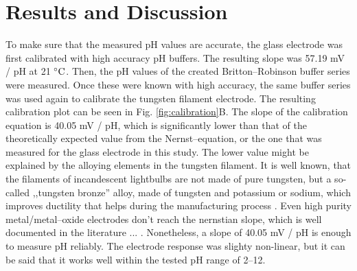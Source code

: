 \documentclass[manuscript=article, journal=jceda8]{achemso}
\begin{document}
\section{Results and Discussion}

To make sure that the measured pH values are accurate, the glass electrode was first calibrated with high accuracy pH buffers. The resulting slope was 57.19 mV / pH at 21 $\celsius$. Then, the pH values of the created Britton--Robinson buffer series were measured. Once these were known with high accuracy, the same buffer series was used again to calibrate the tungsten filament electrode. The resulting calibration plot can be seen in Fig. \ref{fig:calibration}B. The slope of the calibration equation is 40.05 mV / pH, which is significantly lower than that of the theoretically expected value from the Nernst--equation, or the one that was measured for the glass electrode in this study. The lower value might be explained by the alloying elements in the tungsten filament. It is well known, that the filaments of incandescent lightbulbs are not made of pure tungsten, but a so-called ,,tungsten bronze'' alloy, made of tungsten and potassium or sodium, which improves ductility that helps during the manufacturing process \cite{cisternas2015electrode, wechter1972use, schade2010100}. Even high purity metal/metal--oxide electrodes don't reach the nernstian slope, which is well documented in the literature ... . Nonetheless, a slope of 40.05 mV / pH is enough to measure pH reliably. The electrode response was slighty non-linear, but it can be said that it works well within the tested pH range of 2--12.
\end{document}
